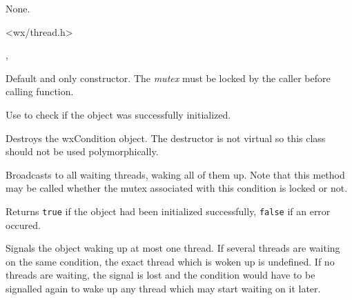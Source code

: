 
None.


<wx/thread.h>


, 


\label{wxconditionctor}


Default and only constructor. The {\it mutex} must be locked by the caller
before calling  function.

Use  to check if the object was successfully
initialized.

\label{wxconditiondtor}


Destroys the wxCondition object. The destructor is not virtual so this class
should not be used polymorphically.

\label{wxconditionbroadcast}


Broadcasts to all waiting threads, waking all of them up. Note that this method
may be called whether the mutex associated with this condition is locked or
not.



\label{wxconditionisok}


Returns {\tt true} if the object had been initialized successfully, {\tt false} 
if an error occured.

\label{wxconditionsignal}


Signals the object waking up at most one thread. If several threads are waiting
on the same condition, the exact thread which is woken up is undefined. If no
threads are waiting, the signal is lost and the condition would have to be
signalled again to wake up any thread which may start waiting on it later.

